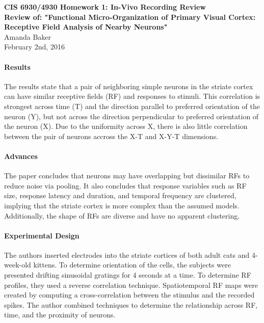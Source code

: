 \documentclass[11pt]{article}
\begin{document}
\begin{center}
{\large {\bf CIS 6930/4930 Homework 1: In-Vivo Recording Review}}\\
{\normalsize {\bf Review of: "Functional Micro-Organization of Primary Visual Cortex: Receptive
Field Analysis of Nearby Neurons"}}\\
Amanda Baker \\
February 2nd, 2016 \\
\end{center}

\paragraph{Results}
The results state that a pair of neighboring simple neurons in the striate cortex
can have similar receptive fields (RF) and responses to stimuli.  This correlation is
strongest across time (T) and the direction parallel to preferred orientation of
the neuron (Y), but not across the direction perpendicular to preferred orientation
of the neuron (X).  Due to the uniformity across X, there is also little correlation
between the pair of neurons accross the X-T and X-Y-T dimensions.

\paragraph{Advances}
The paper concludes that neurons may have overlapping but dissimilar RFs to reduce
noise via pooling. It also concludes that response variables such as RF size, response
latency and duration, and temporal frequency are clustered, implying that the striate
cortex is more complex than the assumed models.  Additionally, the shape of RFs are
diverse and have no apparent clustering.

\paragraph{Experimental Design}
The authors inserted electrodes into the striate cortices of both adult cats and
4-week-old kittens.  To determine orientation of the cells, the subjects were presented
drifting sinusoidal gratings for 4 seconds at a time.  To determine RF profiles,
they used a reverse correlation technique.  Spatiotemporal RF maps were created
by computing a cross-correlation between the stimulus and the recorded spikes.
The author combined techniques to determine the relationship across RF, time, and
the proximity of neurons.
\end{document}
